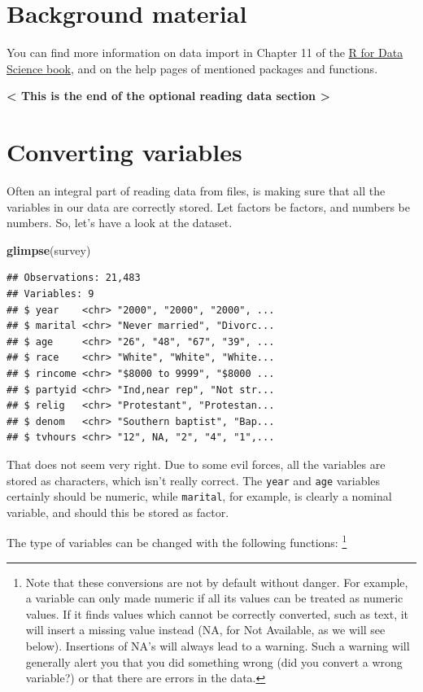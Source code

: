 \documentclass[]{tufte-book}
\newenvironment{Shaded}{}{}
\newcommand{\KeywordTok}[1]{\textcolor[rgb]{0.00,0.44,0.13}{\textbf{#1}}}
\newcommand{\NormalTok}[1]{#1}
\begin{document}
\section{Background material}\label{background-material}

You can find more information on data import in Chapter 11 of the
\href{https://r4ds.had.co.nz/data-import.html}{R for Data Science book},
and on the help pages of mentioned packages and functions.

\textbf{\textless{} This is the end of the optional reading data section
\textgreater{}}

\section{Converting variables}\label{converting-variables}

Often an integral part of reading data from files, is making sure that
all the variables in our data are correctly stored. Let factors be
factors, and numbers be numbers. So, let's have a look at the dataset.

\begin{Shaded}
\begin{Highlighting}[]
\KeywordTok{glimpse}\NormalTok{(survey)}
\end{Highlighting}
\end{Shaded}

\begin{verbatim}
## Observations: 21,483
## Variables: 9
## $ year    <chr> "2000", "2000", "2000", ...
## $ marital <chr> "Never married", "Divorc...
## $ age     <chr> "26", "48", "67", "39", ...
## $ race    <chr> "White", "White", "White...
## $ rincome <chr> "$8000 to 9999", "$8000 ...
## $ partyid <chr> "Ind,near rep", "Not str...
## $ relig   <chr> "Protestant", "Protestan...
## $ denom   <chr> "Southern baptist", "Bap...
## $ tvhours <chr> "12", NA, "2", "4", "1",...
\end{verbatim}

That does not seem very right. Due to some evil forces, all the
variables are stored as characters, which isn't really correct. The
\texttt{year} and \texttt{age} variables certainly should be numeric,
while \texttt{marital}, for example, is clearly a nominal variable, and
should this be stored as factor.

The type of variables can be changed with the following functions:
\footnote{Note that these conversions are not by default without danger.
  For example, a variable can only made numeric if all its values can be
  treated as numeric values. If it finds values which cannot be
  correctly converted, such as text, it will insert a missing value
  instead (NA, for Not Available, as we will see below). Insertions of
  NA's will always lead to a warning. Such a warning will generally
  alert you that you did something wrong (did you convert a wrong
  variable?) or that there are errors in the data.}
\end{document}
